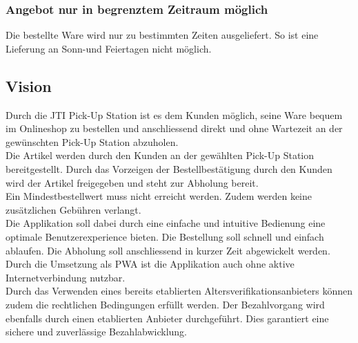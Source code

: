 \subsubsection{Angebot  nur in begrenztem Zeitraum möglich}
Die bestellte Ware wird nur zu bestimmten Zeiten ausgeliefert. So ist eine Lieferung an Sonn-und Feiertagen nicht möglich. 

\subsection{Vision}
Durch die JTI Pick-Up Station ist es dem Kunden möglich, seine Ware bequem im Onlineshop zu bestellen und anschliessend direkt und ohne Wartezeit an der gewünschten Pick-Up Station abzuholen. \\
Die Artikel werden durch den Kunden an der gewählten Pick-Up Station bereitgestellt. Durch das Vorzeigen der Bestellbestätigung durch den Kunden wird der Artikel freigegeben und steht zur Abholung bereit.\\ 
Ein Mindestbestellwert muss nicht erreicht werden. Zudem werden keine zusätzlichen Gebühren verlangt. \\
Die Applikation soll dabei durch eine einfache und intuitive Bedienung eine optimale Benutzerexperience bieten. Die Bestellung soll schnell und einfach ablaufen. Die Abholung soll anschliessend in kurzer Zeit abgewickelt werden. Durch die Umsetzung als \ac{PWA} ist die Applikation auch ohne aktive Internetverbindung nutzbar. \\
Durch das Verwenden eines bereits etablierten Altersverifikationsanbieters können zudem die rechtlichen Bedingungen erfüllt werden. Der Bezahlvorgang wird ebenfalls durch einen etablierten Anbieter durchgeführt. Dies garantiert eine sichere und zuverlässige Bezahlabwicklung. 

\newpage